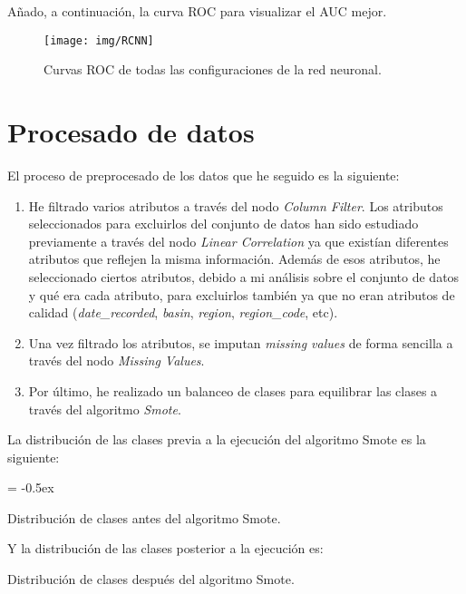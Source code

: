 \documentclass[paper=a4, fontsize=12pt]{article} %
\numberwithin{equation}{section} %
\numberwithin{figure}{section} %
\numberwithin{table}{section} %
\begin{document}
Añado, a continuación, la curva ROC para visualizar el AUC mejor.

	\begin{figure}[H]
	  \centering
	  \texttt{[image: img/RCNN]}
	  \caption{Curvas ROC de todas las configuraciones de la red neuronal.}
	  \label{curva_roc_nn}
	\end{figure}

\section{Procesado de datos}
El proceso de preprocesado de los datos que he seguido es la siguiente:

\begin{enumerate}
\item He filtrado varios atributos a través del nodo \textit{Column Filter}. Los atributos seleccionados para excluirlos del conjunto de datos han sido estudiado previamente a través del nodo \textit{Linear Correlation} ya que existían diferentes atributos que reflejen la misma información. Además de esos atributos, he seleccionado ciertos atributos, debido a mi análisis sobre el conjunto de datos y qué era cada atributo, para excluirlos también ya que no eran atributos de calidad (\textit{date\_recorded}, \textit{basin}, \textit{region}, \textit{region\_code}, etc).
\item Una vez filtrado los atributos, se imputan \textit{missing values} de forma sencilla a través del nodo \textit{Missing Values}.
\item Por último, he realizado un balanceo de clases para equilibrar las clases a través del algoritmo \textit{Smote}.
\end{enumerate}

La distribución de las clases previa a la ejecución del algoritmo Smote es la siguiente:

	\extrarowheight = -0.5ex %
	\renewcommand{\arraystretch}{1.75} %
	\begin{table}[H]
		\begin{center}
		\end{center}
		\caption {Distribución de clases antes del algoritmo Smote.}
		\label {DDbefore}
	\end{table}

Y la distribución de las clases posterior a la ejecución es:
	\begin{table}[H]
		\begin{center}
		\end{center}
		\caption {Distribución de clases después del algoritmo Smote.}
		\label {DDafter}
	\end{table}
\end{document}
